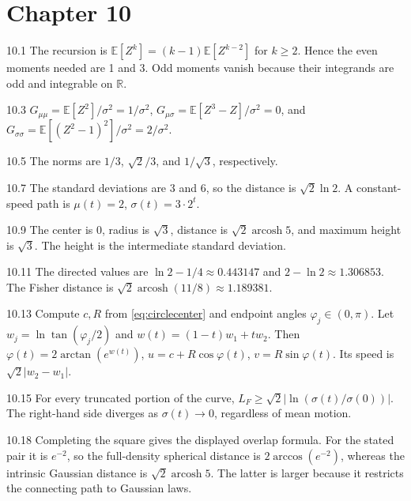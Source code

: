 \documentclass[11pt,oneside,openany]{book}
\theoremstyle{definition}
\theoremstyle{remark}
\newenvironment{answers}{\begin{description}[leftmargin=2.9em,labelwidth=2.5em,labelsep=.4em,itemsep=8pt,font=\normalfont\bfseries]}{\end{description}}
\newcommand{\R}{\mathbb{R}}
\newcommand{\E}{\mathbb{E}}
\newcommand{\arcosh}{\operatorname{arcosh}}
\numberwithin{equation}{chapter}
\begin{document}
\section*{Chapter 10}
\begin{answers}
\item[10.1] The recursion is $\E[Z^k]=(k-1)\E[Z^{k-2}]$ for $k\geq2$. Hence the even moments needed are 1 and 3. Odd moments vanish because their integrands are odd and integrable on $\R$.
\item[10.3] $G_{\mu\mu}=\E[Z^2]/\sigma^2=1/\sigma^2$, $G_{\mu\sigma}=\E[Z^3-Z]/\sigma^2=0$, and $G_{\sigma\sigma}=\E[(Z^2-1)^2]/\sigma^2=2/\sigma^2$.
\item[10.5] The norms are $1/3$, $\sqrt2/3$, and $1/\sqrt3$, respectively.
\item[10.7] The standard deviations are 3 and 6, so the distance is $\sqrt2\ln2$. A constant-speed path is $\mu(t)=2$, $\sigma(t)=3\cdot2^t$.
\item[10.9] The center is 0, radius is $\sqrt3$, distance is $\sqrt2\arcosh5$, and maximum height is $\sqrt3$. The height is the intermediate standard deviation.
\item[10.11] The directed values are $\ln2-1/4\approx0.443147$ and $2-\ln2\approx1.306853$. The Fisher distance is $\sqrt2\arcosh(11/8)\approx1.189381$.
\item[10.13] Compute $c,R$ from \eqref{eq:circlecenter} and endpoint angles $\varphi_j\in(0,\pi)$. Let $w_j=\ln\tan(\varphi_j/2)$ and $w(t)=(1-t)w_1+tw_2$. Then $\varphi(t)=2\arctan(e^{w(t)})$, $u=c+R\cos\varphi(t)$, $v=R\sin\varphi(t)$. Its speed is $\sqrt2|w_2-w_1|$.
\item[10.15] For every truncated portion of the curve, $L_F\geq\sqrt2|\ln(\sigma(t)/\sigma(0))|$. The right-hand side diverges as $\sigma(t)\to0$, regardless of mean motion.
\item[10.18] Completing the square gives the displayed overlap formula. For the stated pair it is $e^{-2}$, so the full-density spherical distance is $2\arccos(e^{-2})$, whereas the intrinsic Gaussian distance is $\sqrt2\arcosh5$. The latter is larger because it restricts the connecting path to Gaussian laws.
\end{answers}
\end{document}
